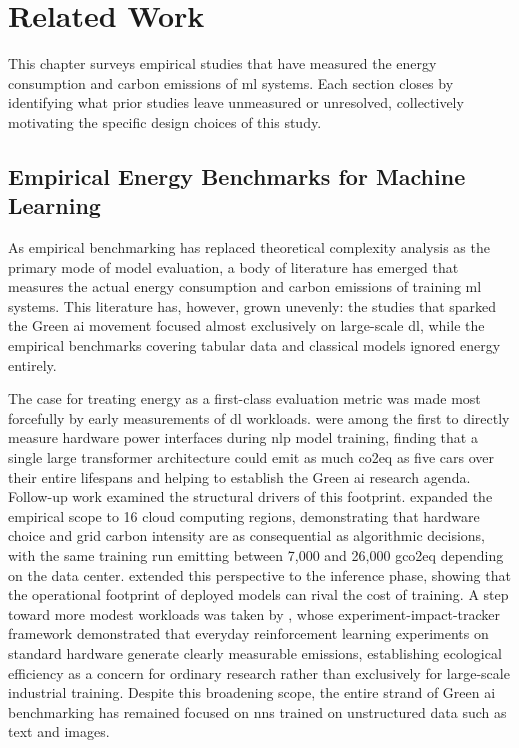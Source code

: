 \chapter{Related Work}
\label{related_work}

This chapter surveys empirical studies that have measured the energy consumption and carbon emissions of \gls{ml} systems. Each section closes by identifying what prior studies leave unmeasured or unresolved, collectively motivating the specific design choices of this study.

\section{Empirical Energy Benchmarks for Machine Learning}
\label{sec:related_benchmarks}

As empirical benchmarking has replaced theoretical complexity analysis as the primary mode of model evaluation, a body of literature has emerged that measures the actual energy consumption and carbon emissions of training \gls{ml} systems. This literature has, however, grown unevenly: the studies that sparked the Green \gls{ai} movement focused almost exclusively on large-scale \gls{dl}, while the empirical benchmarks covering tabular data and classical models ignored energy entirely.

The case for treating energy as a first-class evaluation metric was made most forcefully by early measurements of \gls{dl} workloads. \citeauthor{strubellEnergyPolicyConsiderations2019a} \cite{strubellEnergyPolicyConsiderations2019a} were among the first to directly measure hardware power interfaces during \gls{nlp} model training, finding that a single large transformer architecture could emit as much \gls{co2eq} as five cars over their entire lifespans and helping to establish the Green \gls{ai} research agenda. Follow-up work examined the structural drivers of this footprint. \citeauthor{dodgeMeasuringCarbonIntensity2022} \cite{dodgeMeasuringCarbonIntensity2022} expanded the empirical scope to 16 cloud computing regions, demonstrating that hardware choice and grid carbon intensity are as consequential as algorithmic decisions, with the same training run emitting between 7{,}000 and 26{,}000 \gls{gco2eq} depending on the data center. \citeauthor{desislavovTrendsAIInference2023} \cite{desislavovTrendsAIInference2023} extended this perspective to the inference phase, showing that the operational footprint of deployed models can rival the cost of training. A step toward more modest workloads was taken by \citeauthor{hendersonSystematicReportingEnergy2020} \cite{hendersonSystematicReportingEnergy2020}, whose experiment-impact-tracker framework demonstrated that everyday reinforcement learning experiments on standard hardware generate clearly measurable emissions, establishing ecological efficiency as a concern for ordinary research rather than exclusively for large-scale industrial training. Despite this broadening scope, the entire strand of Green \gls{ai} benchmarking has remained focused on \glspl{nn} trained on unstructured data such as text and images.

